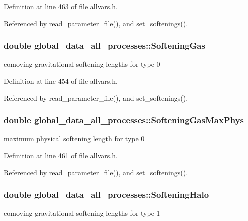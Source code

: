 Definition at line 463 of file allvars.h.



Referenced by read\_\-parameter\_\-file(), and set\_\-softenings().

\hypertarget{structglobal__data__all__processes_a1f85943960c69ff351b48fc2f3933ec2}{
\subsubsection[{SofteningGas}]{\setlength{\rightskip}{0pt plus 5cm}double {\bf global\_\-data\_\-all\_\-processes::SofteningGas}}}
\label{structglobal__data__all__processes_a1f85943960c69ff351b48fc2f3933ec2}
comoving gravitational softening lengths for type 0 

Definition at line 454 of file allvars.h.



Referenced by read\_\-parameter\_\-file(), and set\_\-softenings().

\hypertarget{structglobal__data__all__processes_a1e7634a0c6aa4affa124e095bf32285b}{
\subsubsection[{SofteningGasMaxPhys}]{\setlength{\rightskip}{0pt plus 5cm}double {\bf global\_\-data\_\-all\_\-processes::SofteningGasMaxPhys}}}
\label{structglobal__data__all__processes_a1e7634a0c6aa4affa124e095bf32285b}
maximum physical softening length for type 0 

Definition at line 461 of file allvars.h.



Referenced by read\_\-parameter\_\-file(), and set\_\-softenings().

\hypertarget{structglobal__data__all__processes_a892cb7014ecd4b3910c493755b875b7e}{
\subsubsection[{SofteningHalo}]{\setlength{\rightskip}{0pt plus 5cm}double {\bf global\_\-data\_\-all\_\-processes::SofteningHalo}}}
\label{structglobal__data__all__processes_a892cb7014ecd4b3910c493755b875b7e}
comoving gravitational softening lengths for type 1 

